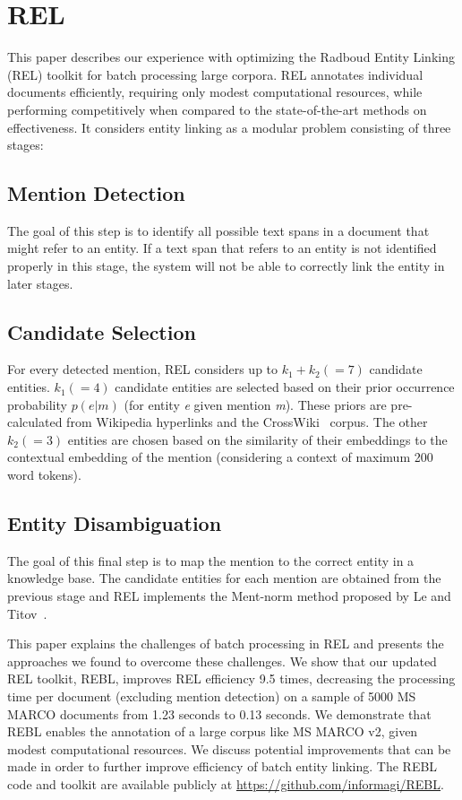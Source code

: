 \section{REL}
This paper describes our experience with optimizing the Radboud Entity Linking (REL) toolkit for batch processing large corpora. REL annotates individual documents efficiently, requiring only modest computational resources, while performing competitively when compared to the state-of-the-art methods on effectiveness. It considers entity linking as a modular problem consisting of three stages: 

\subsection{Mention Detection}
The goal of this step is to identify all possible text spans in a document that might refer to an entity. If a text span that refers to an entity is not identified properly in this stage, the system will not be able to correctly link the entity in later stages.

\subsection{Candidate Selection} For every detected mention, REL considers up to $k_1 + k_2 (=7)$ candidate entities. $k_1 (=4)$ candidate entities are selected based on their prior occurrence probability $p(e|m)$ (for entity \textit{e} given mention \textit{m}). These priors are pre-calculated from Wikipedia hyperlinks and the CrossWiki~\cite{cross-wiki} corpus. The other $k_2 (=3)$ entities are chosen based on the similarity of their embeddings to the contextual embedding of the mention (considering a context of maximum 200 word tokens).

\subsection{Entity Disambiguation} The goal of this final step is to map the mention to the correct entity in a knowledge base. The candidate entities for each mention are obtained from the previous stage and REL implements the Ment-norm method proposed by Le and Titov~\cite{ED-paper}. 

This paper explains the challenges of batch processing in REL and presents the approaches we found to overcome these challenges. We show that our updated REL toolkit, REBL, improves REL efficiency 9.5 times, decreasing the processing time per document (excluding mention detection) on a sample of 5000 MS MARCO documents from 1.23 seconds to 0.13 seconds. We demonstrate that REBL enables the annotation of a large corpus like MS MARCO v2, given modest computational resources. We discuss potential improvements that can be made in order to further improve efficiency of batch entity linking. The REBL code and toolkit are available publicly at \url{https://github.com/informagi/REBL}.

